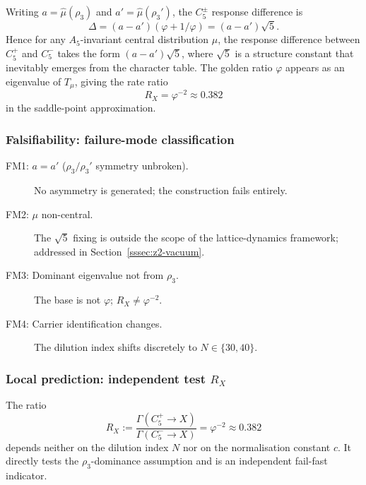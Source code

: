 \documentclass[sn-mathphys-num,Numbered]{sn-jnl}
\theoremstyle{thmstyleone}
\theoremstyle{thmstylethree}
\theoremstyle{thmstyletwo}
\begin{document}
Writing $a = \hat\mu(\rho_3)$ and $a' = \hat\mu(\rho_3')$, the
$C_5^\pm$ response difference is
\begin{equation}
  \Delta = (a - a')(\varphi + 1/\varphi) = (a - a')\sqrt{5}.
  \label{eq:delta-sketch}
\end{equation}
Hence for any $A_5$-invariant central distribution $\mu$, the response
difference between $C_5^+$ and $C_5^-$ takes the form $(a-a')\sqrt{5}$,
where $\sqrt{5}$ is a structure constant that inevitably emerges from
the character table.  The golden ratio $\varphi$ appears as an
eigenvalue of $T_\mu$, giving the rate ratio
\begin{equation}
  R_X = \varphi^{-2} \approx 0.382
  \label{eq:RX}
\end{equation}
in the saddle-point approximation.

\subsubsection{Falsifiability: failure-mode classification}
\label{ssec:falsifiability}

\begin{description}
  \item[FM1: $a = a'$ ($\rho_3/\rho_3'$ symmetry unbroken).]
    No asymmetry is generated; the construction fails entirely.
  \item[FM2: $\mu$ non-central.]
    The $\sqrt{5}$ fixing is outside the scope of the lattice-dynamics
    framework; addressed in Section~\ref{sssec:z2-vacuum}.
  \item[FM3: Dominant eigenvalue not from $\rho_3$.]
    The base is not $\varphi$; $R_X \neq \varphi^{-2}$.
  \item[FM4: Carrier identification changes.]
    The dilution index shifts discretely to $N \in \{30, 40\}$.
\end{description}

\subsubsection{Local prediction: independent test \texorpdfstring{$R_X$}{RX}}
\label{ssec:local-test}

The ratio
\begin{equation}
  R_X := \frac{\Gamma(C_5^+ \to X)}{\Gamma(C_5^- \to X)} = \varphi^{-2}
  \approx 0.382
  \label{eq:RX-def}
\end{equation}
depends neither on the dilution index $N$ nor on the normalisation
constant $c$.  It directly tests the $\rho_3$-dominance assumption and
is an independent fail-fast indicator.
\end{document}
